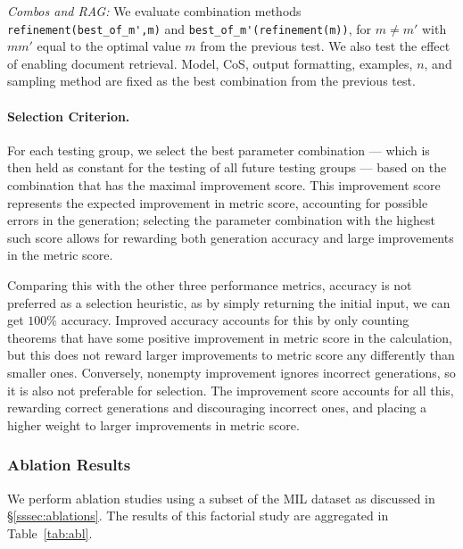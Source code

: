 \textit{Combos and RAG:} We evaluate combination methods \verb|refinement(best_of_m',m)| and \verb|best_of_m'(refinement(m))|, for $m\neq m'$ with $mm'$ equal to the optimal value $m$ from the previous test. We also test the effect of enabling document retrieval. Model, CoS, output formatting, examples, $n$, and sampling method are fixed as the best combination from the previous test.

\paragraph{Selection Criterion.} For each testing group, we select the best parameter combination --- which is then held as constant for the testing of all future testing groups --- based on the combination that has the maximal improvement score. This improvement score represents the expected improvement in metric score, accounting for possible errors in the generation; selecting the parameter combination with the highest such score allows for rewarding both generation accuracy and large improvements in the metric score.

Comparing this with the other three performance metrics, accuracy is not preferred as a selection heuristic, as by simply returning the initial input, we can get $100\%$ accuracy. Improved accuracy accounts for this by only counting theorems that have some positive improvement in metric score in the calculation, but this does not reward larger improvements to metric score any differently than smaller ones. Conversely, nonempty improvement ignores incorrect generations, so it is also not preferable for selection. The improvement score accounts for all this, rewarding correct generations and discouraging incorrect ones, and placing a higher weight to larger improvements in metric score.

\subsubsection{Ablation Results}
\label{ssec:ablation_results}

We perform ablation studies using a subset of the MIL dataset as discussed in \S\ref{sssec:ablations}. The results of this factorial study are aggregated in Table~\ref{tab:abl}.

